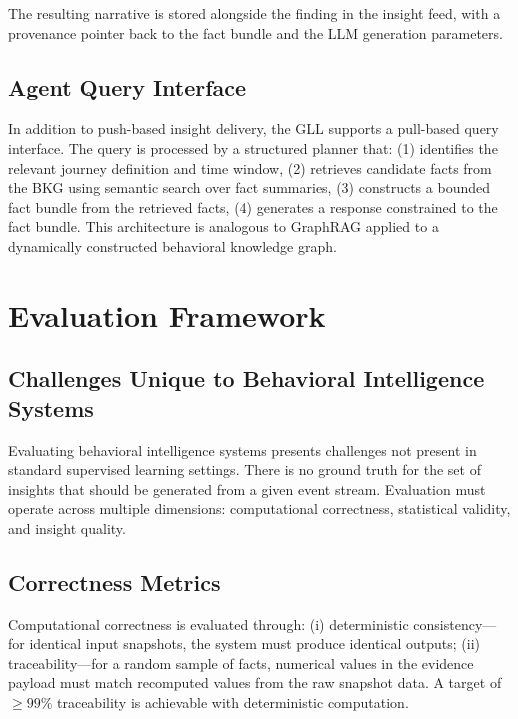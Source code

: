 \documentclass[12pt, a4paper]{article}
\begin{document}
The resulting narrative is stored alongside the finding in the insight feed, with a provenance pointer back to the fact bundle and the LLM generation parameters.

\subsection{Agent Query Interface}

In addition to push-based insight delivery, the GLL supports a pull-based query interface. The query is processed by a structured planner that: (1) identifies the relevant journey definition and time window, (2) retrieves candidate facts from the BKG using semantic search over fact summaries, (3) constructs a bounded fact bundle from the retrieved facts, (4) generates a response constrained to the fact bundle. This architecture is analogous to GraphRAG applied to a dynamically constructed behavioral knowledge graph.

\section{Evaluation Framework}
\label{sec:evaluation}

\subsection{Challenges Unique to Behavioral Intelligence Systems}

Evaluating behavioral intelligence systems presents challenges not present in standard supervised learning settings. There is no ground truth for the set of insights that should be generated from a given event stream. Evaluation must operate across multiple dimensions: computational correctness, statistical validity, and insight quality.

\subsection{Correctness Metrics}

Computational correctness is evaluated through: (i) deterministic consistency---for identical input snapshots, the system must produce identical outputs; (ii) traceability---for a random sample of facts, numerical values in the evidence payload must match recomputed values from the raw snapshot data. A target of $\geq\!99\%$ traceability is achievable with deterministic computation.
\end{document}
